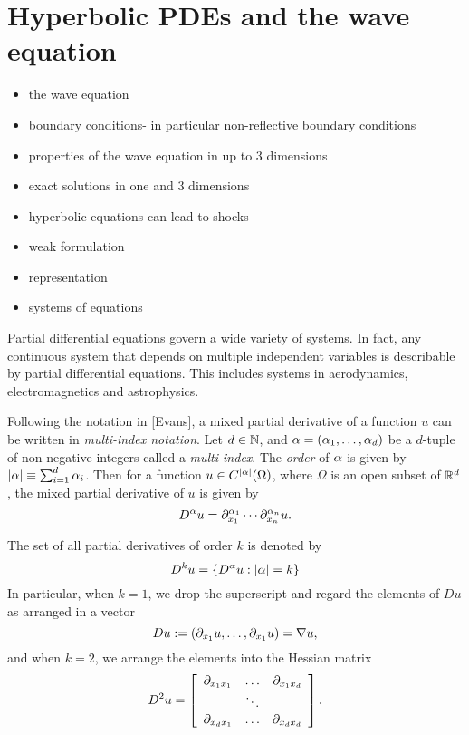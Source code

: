 \chapter{Hyperbolic PDEs and the wave equation}
\begin{itemize}
\item the wave equation
\item boundary conditions- in particular non-reflective boundary conditions
\item properties of the wave equation in up to 3 dimensions
\item exact solutions in one and 3 dimensions
\item hyperbolic equations can lead to shocks
\item weak formulation
\item representation
\item systems of equations
\end{itemize} 

Partial differential equations govern a wide variety of systems. In fact, any continuous system that depends on multiple independent variables is describable by partial differential equations. This includes systems in aerodynamics, electromagnetics and astrophysics.  

Following the notation in [Evans], a mixed partial derivative of a function $u$ can be written in \textit{multi-index notation}. Let $d \in \mathbb{N}$, and $\alpha = ({\alpha}_1,\ldots,{\alpha}_d)$ be a $d$-tuple of non-negative integers called a \textit{multi-index}. The \textit{order} of ${\alpha}$ is given by $| {\alpha} | \equiv \sum_{i=1}^{d} {\alpha}_i$. Then for a function $u \in C^{|{\alpha}|}(\Omega)$, where $\Omega$ is an open subset of $\mathbb{R}^d$, the mixed partial derivative of $u$ is given by 
\begin{equation}
D^{{\alpha}} u = {\partial}^{{\alpha}_1}_{x_1}\cdots{\partial}^{{\alpha}_n}_{x_n} u. 
\end{equation}

The set of all partial derivatives of order $k$ is denoted by 
\begin{equation}
D^k u = \{ D^{{\alpha}} u : | {\alpha} | = k \}
\end{equation}
In particular, when $k=1$, we drop the superscript and regard the elements of $Du$ as arranged in a vector
\begin{equation}
Du := ({\partial}_{x_1} u, \ldots, {\partial}_{x_1} u) = \nabla u,
\end{equation}
and when $k=2$, we arrange the elements into the Hessian matrix
\begin{equation}
D^2 u = \left[ \begin{array}{lcr}
								{\partial}_{x_1 x_1} & \ldots & {\partial}_{x_1 x_d} \\
															& \ddots & 		\\
								{\partial}_{x_d x_1} & \ldots & {\partial}_{x_d x_d} 
								\end{array} \right].
\end{equation}

